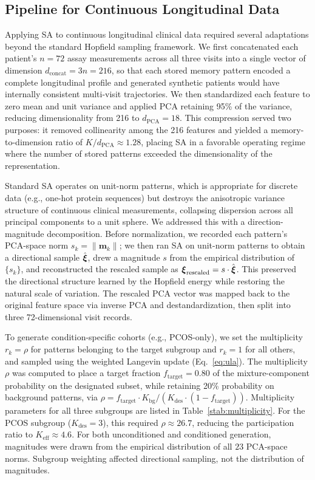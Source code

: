 \subsection{Pipeline for Continuous Longitudinal Data}
\label{sec:pipeline}

Applying SA to continuous longitudinal clinical data required several adaptations
beyond the standard Hopfield sampling framework. We first concatenated each patient's
$n{=}72$ assay measurements across all three visits into a single vector of dimension
$d_{\text{concat}} = 3n = 216$, so that each stored memory pattern encoded a
complete longitudinal profile and generated synthetic patients would have internally
consistent multi-visit trajectories. We then standardized each feature to zero mean
and unit variance and applied PCA retaining 95\% of the variance, reducing
dimensionality from 216 to $d_{\text{PCA}}{=}18$. This compression served two
purposes: it removed collinearity among the 216 features and yielded a
memory-to-dimension ratio of $K/d_{\text{PCA}} \approx 1.28$, placing SA in a
favorable operating regime where the number of stored patterns exceeded the
dimensionality of the representation.

Standard SA operates on unit-norm patterns, which is appropriate for discrete data
(e.g., one-hot protein sequences) but destroys the anisotropic variance structure
of continuous clinical measurements, collapsing dispersion across all principal
components to a unit sphere. We addressed this with a direction-magnitude
decomposition. Before normalization, we recorded each pattern's PCA-space norm
$s_k = \|\mathbf{m}_k\|$; we then ran SA on unit-norm patterns to obtain a
directional sample $\hat{\boldsymbol{\xi}}$, drew a magnitude $s$ from the empirical
distribution of $\{s_k\}$, and reconstructed the rescaled sample as
$\boldsymbol{\xi}_{\text{rescaled}} = s \cdot \hat{\boldsymbol{\xi}}$. This preserved the directional
structure learned by the Hopfield energy while restoring the natural scale of
variation. The rescaled PCA vector was mapped back to the original feature space via
inverse PCA and destandardization, then split into three 72-dimensional visit records.

To generate condition-specific cohorts (e.g., PCOS-only), we set the multiplicity
$r_k = \rho$ for patterns belonging to the target subgroup and $r_k = 1$ for all
others, and sampled using the weighted Langevin update (Eq.~\ref{eq:ula}). The
multiplicity $\rho$ was computed to place a target fraction
$f_{\text{target}} = 0.80$ of the mixture-component probability on the designated subset,
while retaining 20\% probability on background patterns, via
$\rho = f_{\text{target}} \cdot K_{\text{bg}} / (K_{\text{des}} \cdot (1 -
f_{\text{target}}))$. Multiplicity parameters for all three subgroups are
listed in Table~\ref{stab:multiplicity}. For the PCOS subgroup
($K_{\text{des}}{=}3$), this required $\rho \approx 26.7$, reducing the
participation ratio to $K_{\text{eff}} \approx 4.6$. For both unconditioned and
conditioned generation, magnitudes were drawn from the empirical distribution of all $23$
PCA-space norms. Subgroup weighting affected directional sampling, not the distribution of
magnitudes.


